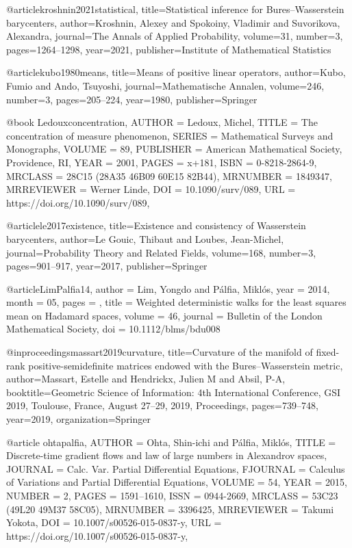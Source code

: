 @article{kroshnin2021statistical,
  title={Statistical inference for Bures--Wasserstein barycenters},
  author={Kroshnin, Alexey and Spokoiny, Vladimir and Suvorikova, Alexandra},
  journal={The Annals of Applied Probability},
  volume={31},
  number={3},
  pages={1264--1298},
  year={2021},
  publisher={Institute of Mathematical Statistics}
}

@article{kubo1980means,
  title={Means of positive linear operators},
  author={Kubo, Fumio and Ando, Tsuyoshi},
  journal={Mathematische Annalen},
  volume={246},
  number={3},
  pages={205--224},
  year={1980},
  publisher={Springer}
}


@book {Ledouxconcentration,
    AUTHOR = {Ledoux, Michel},
     TITLE = {The concentration of measure phenomenon},
    SERIES = {Mathematical Surveys and Monographs},
    VOLUME = {89},
 PUBLISHER = {American Mathematical Society, Providence, RI},
      YEAR = {2001},
     PAGES = {x+181},
      ISBN = {0-8218-2864-9},
   MRCLASS = {28C15 (28A35 46B09 60E15 82B44)},
  MRNUMBER = {1849347},
MRREVIEWER = {Werner Linde},
       DOI = {10.1090/surv/089},
       URL = {https://doi.org/10.1090/surv/089},
}


@article{le2017existence,
  title={Existence and consistency of Wasserstein barycenters},
  author={Le Gouic, Thibaut and Loubes, Jean-Michel},
  journal={Probability Theory and Related Fields},
  volume={168},
  number={3},
  pages={901--917},
  year={2017},
  publisher={Springer}
}

@article{LimPalfia14,
author = {Lim, Yongdo and Pálfia, Miklós},
year = {2014},
month = {05},
pages = {},
title = {Weighted deterministic walks for the least squares mean on Hadamard spaces},
volume = {46},
journal = {Bulletin of the London Mathematical Society},
doi = {10.1112/blms/bdu008}
}


@inproceedings{massart2019curvature,
  title={Curvature of the manifold of fixed-rank positive-semidefinite matrices endowed with the Bures--Wasserstein metric},
  author={Massart, Estelle and Hendrickx, Julien M and Absil, P-A},
  booktitle={Geometric Science of Information: 4th International Conference, GSI 2019, Toulouse, France, August 27--29, 2019, Proceedings},
  pages={739--748},
  year={2019},
  organization={Springer}
}

@article {ohtapalfia,
    AUTHOR = {Ohta, Shin-ichi and P\'{a}lfia, Mikl\'{o}s},
     TITLE = {Discrete-time gradient flows and law of large numbers in
              {A}lexandrov spaces},
   JOURNAL = {Calc. Var. Partial Differential Equations},
  FJOURNAL = {Calculus of Variations and Partial Differential Equations},
    VOLUME = {54},
      YEAR = {2015},
    NUMBER = {2},
     PAGES = {1591--1610},
      ISSN = {0944-2669},
   MRCLASS = {53C23 (49L20 49M37 58C05)},
  MRNUMBER = {3396425},
MRREVIEWER = {Takumi Yokota},
       DOI = {10.1007/s00526-015-0837-y},
       URL = {https://doi.org/10.1007/s00526-015-0837-y},
}

